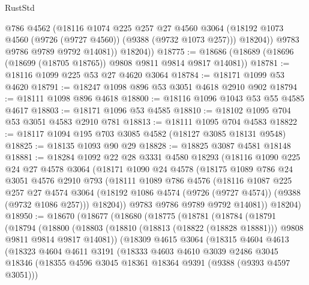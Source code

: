 \begin{lexlean}{RustStd}
\begin{coremodule}
              @786
              @4562
              (@18116
                @1074
                @225
                @257
                @27
                @4560
                @3064
                (@18192 @1073 @4560 (@9726 (@9727 @4560)) (@9388 (@9732 @1073 @257)))
                @18204))
            @9783
            @9786
            @9789
            @9792
            @14081))
        @18204))
@18775 := @18686 (@18689 (@18696 (@18699 (@18705 @18765)) @9808 @9811 @9814 @9817 @14081))
@18781 := @18116 @1099 @225 @53 @27 @4620 @3064
@18784 := @18171 @1099 @53 @4620
@18791 := @18247 @1098 @896 @53 @3051 @4618 @2910 @902
@18794 := @18111 @1098 @896 @4618
@18800 := @18116 @1096 @1043 @53 @55 @4585 @4617
@18803 := @18171 @1096 @53 @4585
@18810 := @18102 @1095 @704 @53 @3051 @4583 @2910 @781
@18813 := @18111 @1095 @704 @4583
@18822 := @18117 @1094 @195 @703 @3085 @4582 (@18127 @3085 @18131 @9548)
@18825 := @18135 @1093 @90 @29
@18828 := @18825 @3087 @4581 @18148
@18881 := @18284
    @1092
    @22
    @28
    @3331
    @4580
    @18293
    (@18116
      @1090
      @225
      @24
      @27
      @4578
      @3064
      (@18171
        @1090
        @24
        @4578
        (@18175
          @1089
          @786
          @24
          @3051
          @4576
          @2910
          @793
          (@18111
            @1089
            @786
            @4576
            (@18116
              @1087
              @225
              @257
              @27
              @4574
              @3064
              (@18192 @1086 @4574 (@9726 (@9727 @4574)) (@9388 (@9732 @1086 @257)))
              @18204))
          @9783
          @9786
          @9789
          @9792
          @14081))
      @18204)
@18950 := @18670
    (@18677
      (@18680
        (@18775
          (@18781
            (@18784
              (@18791
                (@18794
                  (@18800
                    (@18803
                      (@18810 (@18813 (@18822 (@18828 @18881))) @9808 @9811 @9814 @9817 @14081))
                    (@18309
                      @4615
                      @3064
                      (@18315
                        @4604
                        @4613
                        (@18323
                          @4604
                          @4611
                          @3191
                          (@18333
                            @4603
                            @4610
                            @3039
                            @2486
                            @3045
                            @18346
                            (@18355 @4596 @3045 @18361 @18364 @9391 (@9388 (@9393 @4597 @3051)))

\end{coremodule}
\end{lexlean}
